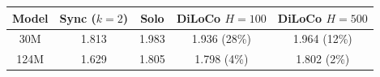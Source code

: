 \begin{tabular}{ccccc}
\toprule
Model & Sync ($k{=}2$) & Solo & DiLoCo $H{=}100$ & DiLoCo $H{=}500$ \\
\midrule
30M & 1.813 & 1.983 & 1.936 (28\%) & 1.964 (12\%) \\
124M & 1.629 & 1.805 & 1.798 (4\%) & 1.802 (2\%) \\
\bottomrule
\end{tabular}
